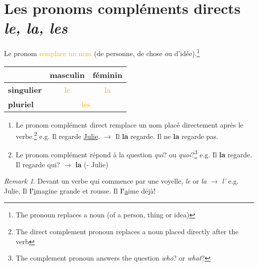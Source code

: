 \documentclass[math,code]{amznotes}
\theoremstyle{remark}
\newtheorem*{remark}{Remark}
\begin{document}
\section{Les pronoms compléments directs \textit{le, la, les}}
Le pronom \textcolor{orange}{remplace un nom} (de personne, de chose ou d'idée).\footnote{The pronoun replaces a noun (of a person, thing or idea)}
\begin{table}[h]
    \centering
    \renewcommand{\arraystretch}{1.5}
    \begin{tabular}{|l|c|c|}
        \hline
         & \textbf{masculin} & \textbf{féminin} \\
        \hline
        \textbf{singulier} & \textcolor{orange}{le} & \textcolor{orange}{la} \\
        \hline
        \textbf{pluriel} & \multicolumn{2}{c|}{\textcolor{orange}{les}} \\
        \hline
    \end{tabular}
\end{table}
\begin{enumerate}
    \item Le pronom complément direct remplace un nom placé directement après le verbe.\footnote{The direct complement pronoun replaces a noun placed directly after the verb} \newline
    e.g. Il regarde \underline{Julie}. $\rightarrow$ Il \textbf{la} regarde. Il ne \textbf{la} regarde pas.
    \item Le pronom complément répond à la question \textit{qui}? ou \textit{quoi}?\footnote{The complement pronoun answers the question \textit{who}? or \textit{what}?} \newline
    e.g. Il \textbf{la} regarde. Il regarde qui? $\rightarrow$ \textbf{la} (- Julie)
\end{enumerate}
\begin{notebox}
    \begin{remark}
        Devant un verbe qui commence par une voyelle, \textit{le} or \textit{la} $\rightarrow$ \textit{l'} \newline
        e.g. Julie, Il \textbf{l'}\underline{i}magine grande et rousse. Il \textbf{l'}\underline{a}ime déjà!
    \end{remark}
\end{notebox}
\end{document}
